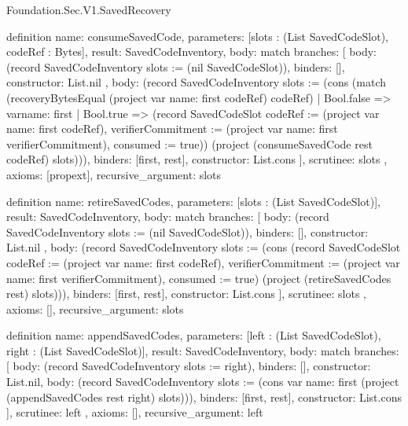\begin{lexlean}{Foundation.Sec.V1.SavedRecovery}
\begin{semanticmodule}
definition{
  name: consumeSavedCode,
  parameters: [slots : (List SavedCodeSlot), codeRef : Bytes],
  result: SavedCodeInventory,
  body: match{
    branches: [
      {
        body: (record SavedCodeInventory {slots := (nil SavedCodeSlot)}),
        binders: [],
        constructor: List.nil
      },
      {
        body: (record SavedCodeInventory {slots := (cons (match (recoveryBytesEqual (project var{
            name: first
          } codeRef) codeRef)
          | Bool.false => var{name: first}
          | Bool.true => (record SavedCodeSlot {codeRef := (project var{
            name: first
          } codeRef), verifierCommitment := (project var{
            name: first
          } verifierCommitment), consumed := true})) (project (consumeSavedCode rest codeRef) slots))}),
        binders: [first, rest],
        constructor: List.cons
      }
    ],
    scrutinee: slots
  },
  axioms: [propext],
  recursive_argument: slots
}

definition{
  name: retireSavedCodes,
  parameters: [slots : (List SavedCodeSlot)],
  result: SavedCodeInventory,
  body: match{
    branches: [
      {
        body: (record SavedCodeInventory {slots := (nil SavedCodeSlot)}),
        binders: [],
        constructor: List.nil
      },
      {
        body: (record SavedCodeInventory {slots := (cons (record SavedCodeSlot {codeRef := (project var{
          name: first
        } codeRef), verifierCommitment := (project var{
          name: first
        } verifierCommitment), consumed := true}) (project (retireSavedCodes rest) slots))}),
        binders: [first, rest],
        constructor: List.cons
      }
    ],
    scrutinee: slots
  },
  axioms: [],
  recursive_argument: slots
}

definition{
  name: appendSavedCodes,
  parameters: [left : (List SavedCodeSlot), right : (List SavedCodeSlot)],
  result: SavedCodeInventory,
  body: match{
    branches: [
      {body: (record SavedCodeInventory {slots := right}), binders: [], constructor: List.nil},
      {
        body: (record SavedCodeInventory {slots := (cons var{
          name: first
        } (project (appendSavedCodes rest right) slots))}),
        binders: [first, rest],
        constructor: List.cons
      }
    ],
    scrutinee: left
  },
  axioms: [],
  recursive_argument: left
}


\end{semanticmodule}
\end{lexlean}
